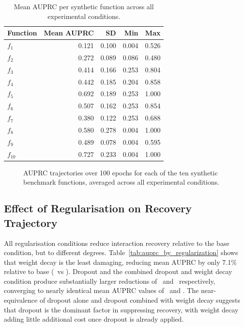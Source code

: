 \documentclass{article}
\begin{document}
\begin{table}[htbp]
\centering
\caption{Mean AUPRC per synthetic function across all experimental conditions.}
\label{tab:auprc_by_function}
\begin{tabular}{lrrrr}
\toprule
Function & Mean AUPRC & SD & Min & Max \\
\midrule
$f_1$    & 0.121 & 0.100 & 0.004 & 0.526 \\
$f_2$    & 0.272 & 0.089 & 0.086 & 0.480 \\
$f_3$    & 0.414 & 0.166 & 0.253 & 0.804 \\
$f_4$    & 0.442 & 0.185 & 0.204 & 0.858 \\
$f_5$    & 0.692 & 0.189 & 0.253 & 1.000 \\
$f_6$    & 0.507 & 0.162 & 0.253 & 0.854 \\
$f_7$    & 0.380 & 0.122 & 0.253 & 0.688 \\
$f_8$    & 0.580 & 0.278 & 0.004 & 1.000 \\
$f_9$    & 0.489 & 0.078 & 0.004 & 0.595 \\
$f_{10}$ & 0.727 & 0.233 & 0.004 & 1.000 \\
\bottomrule
\end{tabular}
\end{table}

\begin{figure}[htbp]
    \centering
    
    \caption{AUPRC trajectories over 100 epochs for each of the ten
    synthetic benchmark functions, averaged across all experimental conditions.}
    \label{fig:auprc_by_function}
\end{figure}


\FloatBarrier
\subsection{Effect of Regularisation on Recovery Trajectory}

All regularisation conditions reduce interaction recovery relative to the
base condition, but to different degrees.
Table~\ref{tab:auprc_by_regularization} shows that weight decay is the
least damaging, reducing mean AUPRC by only 7.1\% relative to base
(\statWeightDecayMeanAUPRC\ vs \statBaselineMeanAUPRC). Dropout and the
combined dropout and weight decay condition produce substantially larger
reductions of \statDropoutDrop\ and \statDropoutWDDrop\ respectively,
converging to nearly identical mean AUPRC values of \statDropoutMeanAUPRC\
and \statDropoutWDMeanAUPRC. The near-equivalence of dropout alone and
dropout combined with weight decay suggests that dropout is the dominant
factor in suppressing recovery, with weight decay adding little additional
cost once dropout is already applied.
\end{document}

